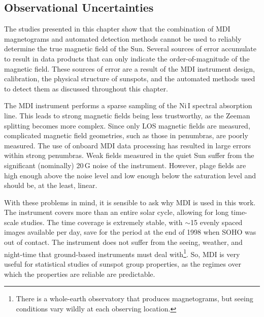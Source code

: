 
\subsection{Observational Uncertainties}

The studies presented in this chapter show that the combination of \gls{MDI} magnetograms and automated detection methods cannot be used to reliably determine the true magnetic field of the Sun. Several sources of error accumulate to result in data products that can only indicate the order-of-magnitude of the magnetic field. These sources of error are a result of the MDI instrument design, calibration, the physical structure of sunspots, and the automated methods used to detect them as discussed throughout this chapter. 

The \gls{MDI} instrument performs a sparse sampling of the Ni\,I spectral absorption line. This leads to strong magnetic fields being less trustworthy, as the Zeeman splitting becomes more complex. Since only \gls{LOS} magnetic fields are measured, complicated magnetic field geometries, such as those in \glspl{penumbra}, are poorly measured. The use of onboard \gls{MDI} data processing has resulted in large errors within strong \glspl{penumbra}. Weak fields measured in the quiet Sun suffer from the significant (nominally) 20\,G noise of the instrument. However, plage fields are high enough above the noise level and low enough below the saturation level and should be, at the least, linear. 

With these problems in mind, it is sensible to ask why \gls{MDI} is used in this work. The instrument covers more than an entire solar cycle, allowing for long time-scale studies. The time coverage is extremely stable, with $\sim$15 evenly spaced images available per day, save for the period at the end of 1998 when \gls{SOHO} was out of contact. The instrument does not suffer from the seeing, weather, and night-time that ground-based instruments must deal with\footnote{There is a whole-earth observatory that produces magnetograms, but seeing conditions vary wildly at each observing location.}. So, \gls{MDI} is very useful for statistical studies of sunspot group properties, as the regimes over which the properties are reliable are predictable.

